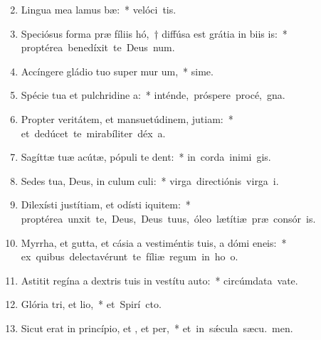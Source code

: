 \begin{flushleft}
\begin{enumerate}[leftmargin=*]
\setcounter{enumi}{1}

\item Lingua mea lamus bæ:~* \mbox{velóci tis.}
\item Speciósus forma præ fíliis hó,~† diffúsa est grátia in biis is:~* \mbox{proptérea benedíxit te Deus  num.}
\item Accíngere gládio tuo super mur um,~* \mbox{sime.}
\item Spécie tua et pulchridine a:~* \mbox{inténde, próspere procé,  gna.}
\item Propter veritátem, et mansuetúdinem,  jutiam:~* \mbox{et dedúcet te mirabíliter déx a.}
\item Sagíttæ tuæ acútæ, pópuli  te dent:~* \mbox{in corda inimi gis.}
\item Sedes tua, Deus, in culum culi:~* \mbox{virga directiónis virga  i.}
\item Dilexísti justítiam, et odísti iquitem:~* \mbox{proptérea unxit te, Deus, Deus tuus, óleo lætítiæ præ consór is.}
\item Myrrha, et gutta, et cásia a vestiméntis tuis, a dómi eneis:~* \mbox{ex quibus delectavérunt te fíliæ regum in ho o.}
\item Astitit regína a dextris tuis in vestítu auto:~* \mbox{circúmdata vate.}
\item Glória tri, et lio,~* \mbox{et Spirí cto.}
\item Sicut erat in princípio, et , et per,~* \mbox{et in s\'{\ae}cula sæcu. men.}


\end{enumerate}
\end{flushleft}

